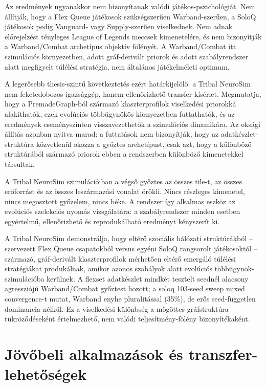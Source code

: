 Az eredmények ugyanakkor nem bizonyítanak valódi játékos-pszichológiát. Nem állítják, hogy a Flex Queue játékosok szükségszerűen Warband-szerűen, a SoloQ játékosok pedig Vanguard- vagy Supply-szerűen viselkednek. Nem adnak előrejelzést tényleges League of Legends meccsek kimenetelére, és nem bizonyítják a Warband/Combat archetípus objektív fölényét. A Warband/Combat itt szimulációs környezetben, adott gráf-derivált priorok és adott szabályrendszer alatt megfigyelt túlélési stratégia, nem általános játékelméleti optimum.

A legerősebb thesis-szintű következtetés ezért határkijelölő: a Tribal NeuroSim nem feketedobozos igazsággép, hanem ellenőrizhető transfer-kísérlet. Megmutatja, hogy a PremadeGraph-ból származó klaszterprofilok viselkedési priorokká alakíthatók, ezek evolúciós többügynökös környezetben futtathatók, és az eredmények eseményszinten visszavezethetők a szimulációs dinamikára. Az oksági állítás azonban nyitva marad: a futtatások nem bizonyítják, hogy az adatkészlet-struktúra közvetlenül okozza a győztes archetípust, csak azt, hogy a különböző struktúrából származó priorok ebben a rendszerben különböző kimenetekkel társultak.

A Tribal NeuroSim szimulációiban a végső győztes az összes tile-t, az összes erőforrást és az
összes leszármazási vonalat örökli. Nincs részleges kimenetel, nincs megosztott
győzelem, nincs béke. A rendszer így alkalmas eszköz az evolúciós szelekciós
nyomás vizsgálatára: a szabályrendszer minden esetben egyértelmű, ellenőrizhető
és reprodukálható eredményt kényszerít ki.

A Tribal NeuroSim demonstrálja, hogy eltérő szociális hálózati struktúrákból -- szervezett Flex Queue csapatokból versus egyéni SoloQ rangsorolt játékosoktól -- származó, gráf-derivált klaszterprofilok mérhetően eltérő emergáló túlélési stratégiákat produkálnak, amikor azonos szabályok alatt evolúciós többügynök-szimulációba kerülnek. A flexset adatkészlet mindkét tesztelt seednél alacsony agressziójú Warband/Combat győztest hozott; a soloq 103-seed sweep mixed convergence-t mutat, Warband enyhe pluralitással (35\%), de erős seed-független dominancia nélkül. Ez a viselkedési különbség a mögöttes gráfstruktúra tükröződéseként értelmezhető, nem valódi teljesítmény-fölény bizonyítékaként.

\bigskip

\section{Jövőbeli alkalmazások és transzfer-lehetőségek}
\label{sec:neurosim-26-future}

